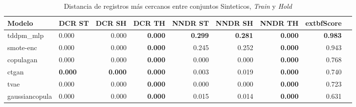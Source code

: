 \begin{table}[H]
\centering
\caption{Distancia de registros más cercanos entre conjuntos Sinteticos, \emph{Train} y \emph{Hold}}
\label{table-dcr-economicos-b-2}
\begin{tabular}{|l|l|r|r|r|r|r|r|r|}
\hline
\rowcolor[gray]{0.8}
Modelo & DCR ST & DCR SH & DCR TH & NNDR ST & NNDR SH & NNDR TH & 	extbf{Score} \\
\hline tddpm\_mlp & 0.000 & 0.000 & \cellcolor[rgb]{0.9, 0.54, 0.52} \bfseries 0.000 & \bfseries 0.299 & \bfseries 0.281 & \cellcolor[rgb]{0.9, 0.54, 0.52} \bfseries 0.000 & \bfseries 0.983 \\
\hline smote-enc & 0.000 & 0.000 & \cellcolor[rgb]{0.9, 0.54, 0.52} \bfseries 0.000 & 0.245 & 0.252 & \cellcolor[rgb]{0.9, 0.54, 0.52} \bfseries 0.000 & 0.943 \\
\hline copulagan & \cellcolor[rgb]{0.9, 0.54, 0.52} 0.000 & \cellcolor[rgb]{0.9, 0.54, 0.52} 0.000 & \cellcolor[rgb]{0.9, 0.54, 0.52} \bfseries 0.000 & \cellcolor[rgb]{0.9, 0.54, 0.52} 0.000 & \cellcolor[rgb]{0.9, 0.54, 0.52} 0.000 & \cellcolor[rgb]{0.9, 0.54, 0.52} \bfseries 0.000 & 0.768 \\
\hline ctgan & \bfseries 0.000 & \bfseries 0.000 & \cellcolor[rgb]{0.9, 0.54, 0.52} \bfseries 0.000 & 0.003 & 0.019 & \cellcolor[rgb]{0.9, 0.54, 0.52} \bfseries 0.000 & 0.740 \\
\hline tvae & 0.000 & 0.000 & \cellcolor[rgb]{0.9, 0.54, 0.52} \bfseries 0.000 & 0.000 & 0.000 & \cellcolor[rgb]{0.9, 0.54, 0.52} \bfseries 0.000 & 0.723 \\
\hline gaussiancopula & 0.000 & 0.000 & \cellcolor[rgb]{0.9, 0.54, 0.52} \bfseries 0.000 & 0.015 & 0.014 & \cellcolor[rgb]{0.9, 0.54, 0.52} \bfseries 0.000 & 0.631 \\
\hline
\end{tabular}
\end{table}
